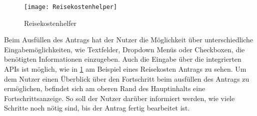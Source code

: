 \begin{figure}[h]
  \centering
    \texttt{[image: Reisekostenhelper]}
    \caption{Reisekostenhelfer}\label{Reisekostenhelfer}
\end{figure}


Beim Ausfüllen des Antrags hat der Nutzer die Möglichkeit über unterschiedliche Eingabemöglichkeiten, wie Textfelder, 
Dropdown Menüs oder Checkboxen, die benötigten Informationen einzugeben. Auch die Eingabe über die integrierten APIs ist möglich, 
wie in \ref{Reisekostenhelfer} am Beispiel eines Reisekosten Antrags zu sehen. Um dem Nutzer einen Überblick über den Fortschritt 
beim ausfüllen des Antrags zu ermöglichen, befindet sich am oberen Rand des Hauptinhalts eine Fortschrittsanzeige. 
So soll der Nutzer darüber informiert werden, wie viele Schritte noch nötig sind, bis der Antrag fertig bearbeitet ist. 

